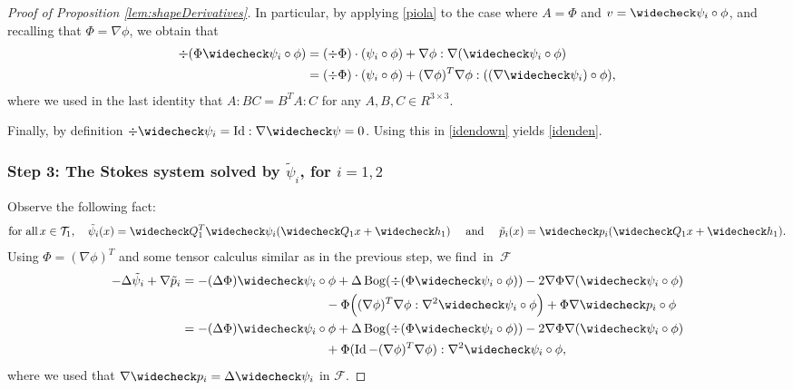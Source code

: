 \documentclass[10pt]{amsart}
\DeclareMathOperator{\Bog}{Bog}
\DeclareMathOperator{\Id}{Id}
\theoremstyle{definition}
\theoremstyle{remark}
\begin{document}
\begin{proof}[Proof of Proposition \ref{lem:shapeDerivatives}]
In particular, by applying \eqref{piola} to the case where $A= \Phi$ and $v= \widecheck \psi_i \circ \phi$, and recalling that $\Phi = \nabla \phi$, we obtain that
\begin{equation}
\begin{aligned}
\div (\Phi \widecheck \psi_i \circ \phi) &=
(\div \Phi) \cdot (\psi_i \circ \phi) +
\nabla \phi : \nabla (\widecheck \psi_i \circ \phi) \\
&= (\div \Phi) \cdot (\psi_i \circ \phi) +
(\nabla \phi)^T \nabla \phi : ((\nabla \widecheck \psi_i) \circ \phi), \label{idendown}
\end{aligned}
\end{equation}
where we used in the last identity that $A:BC = B^T A : C$ for any $A,B,C \in R^{3 \times 3}$.

Finally, by definition $\div \widecheck \psi_i = \Id : \nabla \widecheck \psi = 0$. Using this in \eqref{idendown} yields \eqref{idenden}.

\subsubsection*{Step 3: The Stokes system solved by $\tilde \psi_i$, for $i=1,2$}
Observe the following fact:
\begin{equation} \label{soliv-tout}
\text{for all} \, x \in \mathcal T_1, \quad
\tilde \psi_i (x) = \widecheck Q_1^T \widecheck \psi_i (\widecheck Q_1 x + \widecheck h_1)
\quad \text{ and } \quad
\tilde p_i(x) = \widecheck p_i (\widecheck Q_1 x + \widecheck h_1).
\end{equation}
Using $\Phi \!=\! (\nabla \phi)^T$ and some tensor calculus similar as in the previous step, we find~in~$\mathcal F$
\begin{align*}
- \Delta \tilde \psi_i + \nabla \tilde p_i &= - (\Delta \Phi) \widecheck \psi_i \circ \phi + \Delta \Bog (\div (\Phi \widecheck \psi_i \circ \phi))
- 2 \nabla \Phi \nabla (\widecheck \psi_i \circ \phi) \\
& \hspace*{4cm}-\Phi \Big((\nabla \phi)^T \nabla \phi : \nabla^2 \widecheck \psi_i \circ \phi \Big) + \Phi \nabla \widecheck p_i \circ \phi \\
& = -(\Delta \Phi) \widecheck \psi_i \circ \phi + \Delta \Bog (\div (\Phi \widecheck \psi_i \circ \phi)) - 2 \nabla \Phi \nabla (\widecheck \psi_i \circ \phi) \\
&\hspace*{4cm}+ \Phi (\Id - (\nabla \phi)^T\nabla \phi) : \nabla^2 \widecheck \psi_i \circ \phi,
\end{align*}
where we used that $ \nabla \widecheck p_i = \Delta \widecheck \psi_i$ in $\mathcal F$.


\end{proof}
\end{document}
